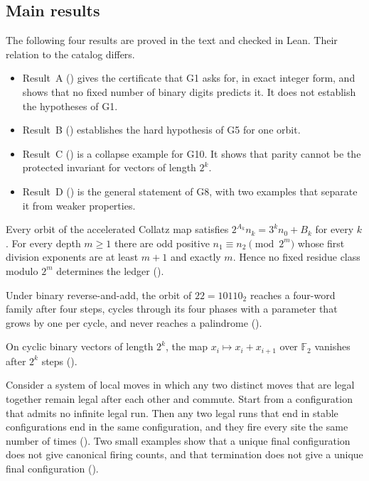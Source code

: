 \subsection{Main results}\label{sec:intro-results}

The following four results are proved in the text and checked in Lean. Their relation to the
catalog differs.
\begin{itemize}
  \item Result~A () gives the certificate that G1 asks for, in exact integer form, and
    shows that no fixed number of binary digits predicts it. It does not establish the hypotheses
    of G1.
  \item Result~B () establishes the hard hypothesis of G5 for one orbit.
  \item Result~C () is a collapse example for G10. It shows that parity cannot be the
    protected invariant for vectors of length $2^k$.
  \item Result~D () is the general statement of G8, with two examples that separate
    it from weaker properties.
\end{itemize}

\begin{headline}
Every orbit of the accelerated Collatz map satisfies $2^{A_k} n_k = 3^k n_0 + B_k$ for every
$k$. For every depth $m \ge 1$ there are odd positive $n_1 \equiv n_2 \pmod{2^m}$ whose first
division exponents are at least $m+1$ and exactly $m$. Hence no fixed residue class modulo $2^m$
determines the ledger ().
\end{headline}

\begin{headline}
Under binary reverse-and-add, the orbit of $22 = 10110_2$ reaches a four-word family after four
steps, cycles through its four phases with a parameter that grows by one per cycle, and never
reaches a palindrome ().
\end{headline}

\begin{headline}
On cyclic binary vectors of length $2^k$, the map $x_i \mapsto x_i + x_{i+1}$ over
$\mathbb{F}_2$ vanishes after $2^k$ steps ().
\end{headline}

\begin{headline}
Consider a system of local moves in which any two distinct moves that are legal together remain
legal after each other and commute. Start from a configuration that admits no infinite legal run.
Then any two legal runs that end in stable configurations end in the same configuration, and they
fire every site the same number of times (). Two small examples show that a unique
final configuration does not give canonical firing counts, and that termination does not give a
unique final configuration ().
\end{headline}

